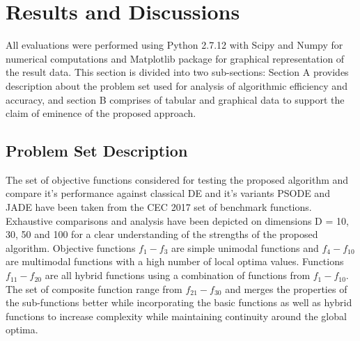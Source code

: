 


\section{Results and Discussions}

All evaluations were performed using Python 2.7.12 with Scipy\cite{oliphant2007python} and Numpy\cite{van2011numpy} for numerical computations and Matplotlib \cite{Hunter:2007} package for graphical representation of the result data. This section is divided into two sub-sections: Section A provides description about the problem set used for analysis of algorithmic efficiency and accuracy, and section B comprises of tabular and graphical data to support the claim of eminence of the proposed approach.

\subsection{Problem Set Description}

The set of objective functions considered for testing the proposed algorithm and compare it's performance against classical DE and it's variants PSODE and JADE have been taken from the CEC 2017 set of benchmark functions. Exhaustive comparisons and analysis have been depicted on dimensions D = 10, 30, 50 and 100 for a clear understanding of the strengths of the proposed algorithm. Objective functions $f_1 - f_3$ are simple unimodal functions and $f_4 - f_{10}$ are multimodal functions with a high number of local optima values. Functions $f_{11} - f_{20}$ are all hybrid functions using a combination of functions from $f_1 - f_{10}$. The set of composite function range from $f_{21} - f_{30}$ and merges the properties of the sub-functions better while incorporating the basic functions as well as hybrid functions to increase complexity while maintaining continuity around the global optima.

